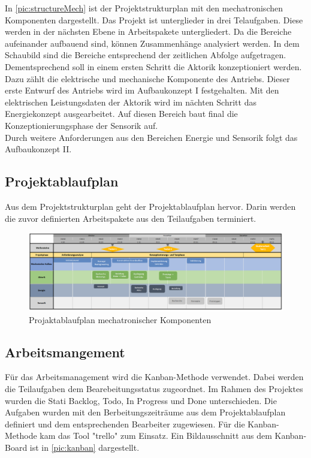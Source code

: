 In \autoref{pic:structureMech} ist der  Projektstrukturplan mit den mechatronischen Komponenten dargestellt. 
Das Projekt ist unterglieder in drei Telaufgaben. Diese werden in der nächsten Ebene in Arbeitspakete untergliedert. 
Da die Bereiche aufeinander aufbauend sind, können Zusammenhänge analysiert werden. In dem Schaubild sind die Bereiche entsprechend der zeitlichen Abfolge aufgetragen. Dementsprechend soll in einem ersten Schritt die Aktorik konzeptioniert werden. Dazu zählt die elektrische und mechanische Komponente des Antriebs. Dieser erste Entwurf des Antriebs wird im Aufbaukonzept I festgehalten. Mit den elektrischen Leistungsdaten der Aktorik wird im nächten Schritt das Energiekonzept ausgearbeitet. Auf diesen Bereich baut final die Konzeptionierungsphase der Sensorik auf. \\ 
Durch weitere Anforderungen aus den Bereichen Energie und Sensorik folgt das Aufbaukonzept II. 

\newpage
\subsection{Projektablaufplan}
\label{projektablaufplan}
Aus dem Projektstrukturplan geht der Projektablaufplan hervor. Darin werden die zuvor definierten Arbeitspakete aus den Teilaufgaben terminiert. 
\begin{figure}[t]
	\begin{center}
		\includegraphics[width=17cm]{roadmap.png}
		\caption{Projaktablaufplan mechatronischer Komponenten}
		\label{pic:roadmap}
	\end{center}
\end{figure}



\subsection{Arbeitsmangement}
\label{sec:arbeitsmanagement}
Für das Arbeitsmanagement wird die Kanban-Methode verwendet. Dabei werden die Teilaufgaben dem Bearebeitungsstatus zugeordnet. Im Rahmen des Projektes wurden die Stati Backlog, Todo, In Progress und Done  unterschieden. Die Aufgaben wurden mit den Berbeitungszeiträume aus dem Projektablaufplan definiert und dem entsprechenden Bearbeiter zugewiesen. 
Für die Kanban-Methode kam das Tool "trello" zum Einsatz. Ein Bildausschnitt aus dem Kanban-Board ist in \autoref{pic:kanban} dargestellt. 


